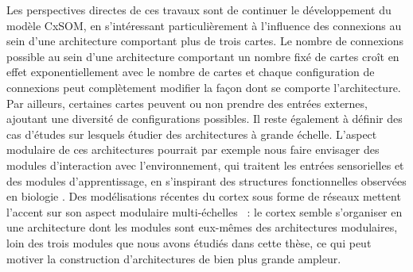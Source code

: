 Les perspectives directes de ces travaux sont de continuer le développement du modèle CxSOM, en s'intéressant particulièrement à l'influence des connexions au sein d'une architecture comportant plus de trois cartes.
Le nombre de connexions possible au sein d'une architecture comportant un nombre fixé de cartes croît en effet exponentiellement avec le nombre de cartes et chaque configuration de connexions peut complètement modifier la façon dont se comporte l'architecture. 
Par ailleurs, certaines cartes peuvent ou non prendre des entrées externes, ajoutant une diversité de configurations possibles.
Il reste également à définir des cas d'études sur lesquels étudier des architectures à grande échelle.
L'aspect modulaire de ces architectures pourrait par exemple nous faire envisager des modules d'interaction avec l'environnement, qui traitent les entrées sensorielles et des modules d'apprentissage, en s'inspirant des structures fonctionnelles observées en biologie \parencite{Ellefsen2015NeuralMH}. 
Des modélisations récentes du cortex sous forme de réseaux mettent l'accent sur son aspect modulaire multi-échelles \parencite{betzel_multi-scale_2017}~: le cortex semble s'organiser en une architecture dont les modules sont eux-mêmes des architectures modulaires, loin des trois modules que nous avons étudiés dans cette thèse, ce qui peut motiver la construction d'architectures de bien plus grande ampleur.

